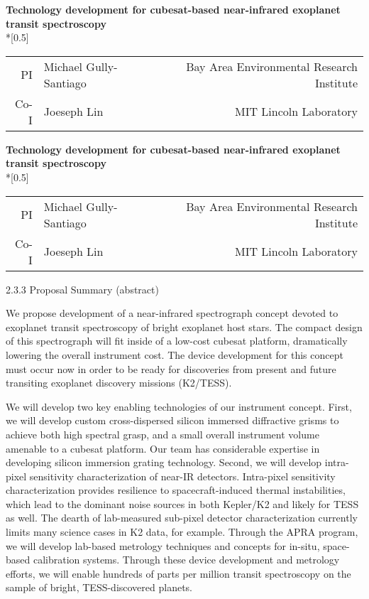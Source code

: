\documentclass[12pt]{article}
\makeatletter
\renewcommand*{\maketitle}{
\begin{center}
  \begingroup
  \Large
  \textbf{Technology development for cubesat-based near-infrared exoplanet transit spectroscopy} \\*[0.5\baselineskip]
  \normalsize
\begin{tabular}{r@{:\quad}lr}
          PI & Michael Gully-Santiago       & Bay Area Environmental Research Institute       \\
        Co-I & Joeseph Lin & MIT Lincoln Laboratory
\end{tabular}
  \endgroup
\end{center}
}
\makeatother
\begin{document}
\raggedbottom
\fontsize{12}{16}\selectfont



\maketitle

\tableofcontents



\clearpage


\maketitle

2.3.3 Proposal Summary (abstract)

We propose development of a near-infrared spectrograph concept devoted to exoplanet transit spectroscopy of bright exoplanet host stars.  The compact design of this spectrograph will fit inside of a low-cost cubesat platform, dramatically lowering the overall instrument cost. The device development for this concept must occur now in order to be ready for discoveries from present and future transiting exoplanet discovery missions (K2/TESS).

We will develop two key enabling technologies of our instrument concept.  First, we will develop custom cross-dispersed silicon immersed diffractive grisms to achieve both high spectral grasp, and a small overall instrument volume amenable to a cubesat platform.  Our team has considerable expertise in developing silicon immersion grating technology.  Second, we will develop intra-pixel sensitivity characterization of near-IR detectors.  Intra-pixel sensitivity characterization provides resilience to spacecraft-induced thermal instabilities, which lead to the dominant noise sources in both Kepler/K2 and likely for TESS as well.  The dearth of lab-measured sub-pixel detector characterization currently limits many science cases in K2 data, for example.  Through the APRA program, we will develop lab-based metrology techniques and concepts for in-situ, space-based calibration systems.  Through these device development and metrology efforts, we will enable hundreds of parts per million transit spectroscopy on the sample of bright, TESS-discovered planets.
\end{document}
